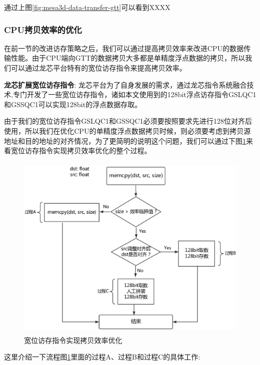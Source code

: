 通过上图\ref{fig:mesa3d-data-transfer-gtt}可以看到XXXX

\subsubsection{CPU拷贝效率的优化}

在前一节的改进访存策略之后，我们可以通过提高拷贝效率来改进CPU的数据传输性能。由于CPU端向GTT的数据拷贝大多都是单精度浮点数据的拷贝，所以我们可以通过龙芯平台特有的宽位访存指令来提高拷贝效率。

\textbf{龙芯扩展宽位访存指令}: 龙芯平台为了自身发展的需求，通过龙芯指令系统融合技术\cite{loongson-merge},专门开发了一些宽位访存指令，诸如本文使用到的128bit浮点访存指令GSLQC1和GSSQC1可以实现128bit的浮点数据存取。

由于我们的宽位访存指令GSLQC1和GSSQC1必须要按照要求先进行128位对齐后使用，所以我们在优化CPU的单精度浮点数据拷贝时候，则必须要考虑到拷贝源地址和目的地址的对齐情况，为了更简明的说明这个问题，我们可以通过下图\ref{fig:memcpy}来看宽位访存指令实现拷贝效率优化的整个过程。

\begin{figure}[H] 
  \centering
  \includegraphics[width=16cm,height=9cm]{figures/chap03/memcpy}
  \caption{宽位访存指令实现拷贝效率优化}
  \label{fig:memcpy}
\end{figure}

这里介绍一下流程图\ref{fig:memcpy}里面的过程A、过程B和过程C的具体工作:

